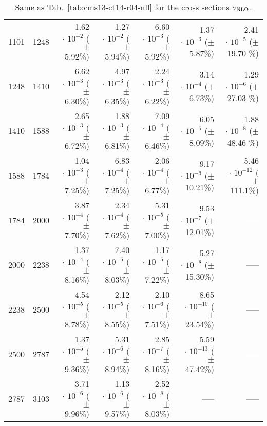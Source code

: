 \begin{table}[h!]
\begin{center}
\begin{tabular}{|r|r|r|r|r|r|r|}
1101 & 1248 & 1.62$\,\cdot\, 10^{-2}$  ($\pm\!\!$  5.92\%) & 1.27$\,\cdot\, 10^{-2}$  ($\pm\!\!$  5.94\%) & 6.60$\,\cdot\, 10^{-3}$  ($\pm\!\!$  5.92\%) & 1.37$\,\cdot\, 10^{-3}$  ($\pm\!\!$  5.87\%) & 2.41$\,\cdot\, 10^{-5}$  ($\pm\!\!$ 19.70 \%)\\
1248 & 1410 & 6.62$\,\cdot\, 10^{-3}$  ($\pm\!\!$  6.30\%) & 4.97$\,\cdot\, 10^{-3}$  ($\pm\!\!$  6.35\%) & 2.24$\,\cdot\, 10^{-3}$  ($\pm\!\!$  6.22\%) & 3.14$\,\cdot\, 10^{-4}$  ($\pm\!\!$  6.73\%) & 1.29$\,\cdot\, 10^{-6}$  ($\pm\!\!$ 27.03 \%)\\
1410 & 1588 & 2.65$\,\cdot\, 10^{-3}$  ($\pm\!\!$  6.72\%) & 1.88$\,\cdot\, 10^{-3}$  ($\pm\!\!$  6.81\%) & 7.09$\,\cdot\, 10^{-4}$  ($\pm\!\!$  6.46\%) & 6.05$\,\cdot\, 10^{-5}$  ($\pm\!\!$  8.09\%) & 1.88$\,\cdot\, 10^{-8}$  ($\pm\!\!$ 48.46 \%)\\
1588 & 1784 & 1.04$\,\cdot\, 10^{-3}$  ($\pm\!\!$  7.25\%) & 6.83$\,\cdot\, 10^{-4}$  ($\pm\!\!$  7.25\%) & 2.06$\,\cdot\, 10^{-4}$  ($\pm\!\!$  6.77\%) & 9.17$\,\cdot\, 10^{-6}$  ($\pm\!\!$ 10.21\%) & 5.46$\,\cdot\, 10^{-12}$  ($\pm\!\!$ 111.1\%)\\
1784 & 2000 & 3.87$\,\cdot\, 10^{-4}$  ($\pm\!\!$  7.70\%) & 2.34$\,\cdot\, 10^{-4}$  ($\pm\!\!$  7.62\%) & 5.31$\,\cdot\, 10^{-5}$  ($\pm\!\!$  7.00\%) & 9.53$\,\cdot\, 10^{-7}$  ($\pm\!\!$ 12.01\%) & -----\\
2000 & 2238 & 1.37$\,\cdot\, 10^{-4}$  ($\pm\!\!$  8.16\%) & 7.40$\,\cdot\, 10^{-5}$  ($\pm\!\!$  8.03\%) & 1.17$\,\cdot\, 10^{-5}$  ($\pm\!\!$  7.22\%) & 5.27$\,\cdot\, 10^{-8}$  ($\pm\!\!$ 15.30\%) & -----\\
2238 & 2500 & 4.54$\,\cdot\, 10^{-5}$  ($\pm\!\!$  8.78\%) & 2.12$\,\cdot\, 10^{-5}$  ($\pm\!\!$  8.55\%) & 2.10$\,\cdot\, 10^{-6}$  ($\pm\!\!$  7.51\%) & 8.65$\,\cdot\, 10^{-10}$  ($\pm\!\!$ 23.54\%) & -----\\
2500 & 2787 & 1.37$\,\cdot\, 10^{-5}$  ($\pm\!\!$  9.36\%) & 5.31$\,\cdot\, 10^{-6}$  ($\pm\!\!$  8.94\%) & 2.85$\,\cdot\, 10^{-7}$  ($\pm\!\!$  8.16\%) & 5.59$\,\cdot\, 10^{-13}$  ($\pm\!\!$ 47.42\%) & -----\\
2787 & 3103 & 3.71$\,\cdot\, 10^{-6}$  ($\pm\!\!$  9.96\%) & 1.13$\,\cdot\, 10^{-6}$  ($\pm\!\!$  9.57\%) & 2.52$\,\cdot\, 10^{-8}$  ($\pm\!\!$  8.03\%) & ----- & -----\\
%
\hline
\end{tabular}
\caption{\label{tab:cms13-ct14-r04}
  Same as Tab.~\ref{tab:cms13-ct14-r04-nll} for the cross sections $\sigma_{\rm NLO}$.
}
\end{center}
\end{table}

